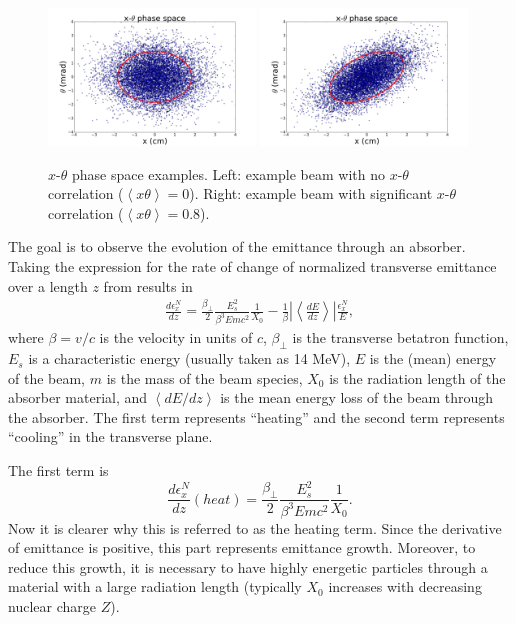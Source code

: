 \begin{figure}
  \begin{center}
    \includegraphics[width=0.49\textwidth]{Figures/ellipse0} 
    \includegraphics[width=0.49\textwidth]{Figures/ellipse1} 
  \caption[$x$-$\theta$ phase space examples.]{$x$-$\theta$ phase space examples. Left: example beam with no $x$-$\theta$ correlation ($\left<x\theta\right>=0$). Right: example beam with significant $x$-$\theta$ correlation ($\left<x\theta\right>=0.8$).}
  \label{fig:ellipses}
 \end{center}
\end{figure}

The goal is to observe the evolution of the emittance through an absorber. Taking the expression for the rate of change of normalized transverse emittance over a length $z$ from \cite{neuffer_intro} results in
\begin{align*}
\frac{d\epsilon^N _x}{dz}=\frac{\beta_\perp}{2}\frac{E_s^2}{\beta^3Emc^2}\frac{1}{X_0}-\frac{1}{\beta}\left| \left<\frac{dE}{dz}\right>\right| \frac{\epsilon_x^N}{E},
\end{align*}
where $\beta=v/c$ is the velocity in units of $c$, $\beta_\perp$ is the transverse betatron function, $E_s$ is a characteristic energy (usually taken as 14 MeV), $E$ is the (mean) energy of the beam, $m$ is the mass of the beam species, $X_0$ is the radiation length of the absorber material, and $\left<dE/dz\right>$ is the mean energy loss of the beam through the absorber. The first term represents ``heating'' and the second term represents ``cooling'' in the transverse plane. 

The first term is
\begin{equation}
\label{eqn:emittanceheat}
\frac{d\epsilon_x^N}{dz}(heat) = \frac{\beta_\perp}{2}\frac{E_s^2}{\beta^3Emc^2}\frac{1}{X_0}.
\end{equation}
Now it is clearer why this is referred to as the heating term. Since the derivative of emittance is positive, this part represents emittance growth. Moreover, to reduce this growth, it is necessary to have highly energetic particles through a material with a large radiation length (typically $X_0$ increases with decreasing nuclear charge $Z$).

